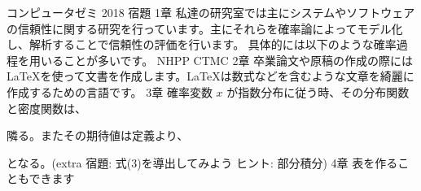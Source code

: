 \documentclass[a4paper,12pt]{article}
\begin{document}
コンピュータゼミ 2018 宿題
1章
私達の研究室では主にシステムやソフトウェアの信頼性に関する研究を行っています。主にそれらを確率論によってモデル化し、解析することで信頼性の評価を行います。
具体的には以下のような確率過程を用いることが多いです。
NHPP
CTMC
2章
卒業論文や原稿の作成の際にはLaTeXを使って文書を作成します。LaTeXは数式などを含むような文章を綺麗に作成するための言語です。
3章
確率変数 $x$ が指数分布に従う時、その分布関数と密度関数は、


隣る。またその期待値は定義より、

となる。(extra 宿題: 式(3)を導出してみよう ヒント: 部分積分)
4章
表を作ることもできます
\end{document}
